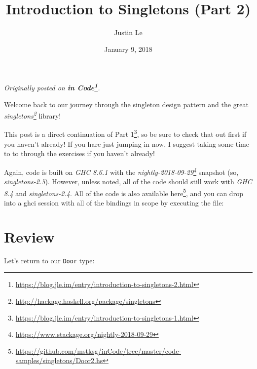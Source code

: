 \documentclass[]{article}
\title{Introduction to Singletons (Part 2)}
\author{Justin Le}
\date{January 9, 2018}
\newenvironment{Shaded}{}{}
\newcommand{\CommentTok}[1]{\textcolor[rgb]{0.38,0.63,0.69}{\textit{#1}}}
\newcommand{\DataTypeTok}[1]{\textcolor[rgb]{0.56,0.13,0.00}{#1}}
\newcommand{\ExtensionTok}[1]{#1}
\newcommand{\KeywordTok}[1]{\textcolor[rgb]{0.00,0.44,0.13}{\textbf{#1}}}
\newcommand{\NormalTok}[1]{#1}
\newcommand{\OperatorTok}[1]{\textcolor[rgb]{0.40,0.40,0.40}{#1}}
\newcommand{\OtherTok}[1]{\textcolor[rgb]{0.00,0.44,0.13}{#1}}
\renewcommand{\href}[2]{#2\footnote{\url{#1}}}
\begin{document}
\maketitle

\emph{Originally posted on
\textbf{\href{https://blog.jle.im/entry/introduction-to-singletons-2.html}{in
Code}}.}

Welcome back to our journey through the singleton design pattern and the great
\emph{\href{http://hackage.haskell.org/package/singletons}{singletons}} library!

This post is a direct continuation of
\href{https://blog.jle.im/entry/introduction-to-singletons-1.html}{Part 1}, so
be sure to check that out first if you haven't already! If you hare just jumping
in now, I suggest taking some time to to through the exercises if you haven't
already!

Again, code is built on \emph{GHC 8.6.1} with the
\emph{\href{https://www.stackage.org/nightly-2018-09-29}{nightly-2018-09-29}}
snapshot (so, \emph{singletons-2.5}). However, unless noted, all of the code
should still work with \emph{GHC 8.4} and \emph{singletons-2.4}. All of the code
is also available
\href{https://github.com/mstksg/inCode/tree/master/code-samples/singletons/Door2.hs}{here},
and you can drop into a ghci session with all of the bindings in scope by
executing the file:

\begin{Shaded}
\end{Shaded}

\hypertarget{review}{%
\section{Review}\label{review}}

Let's return to our \texttt{Door} type:

\begin{Shaded}
\end{Shaded}
\end{document}
